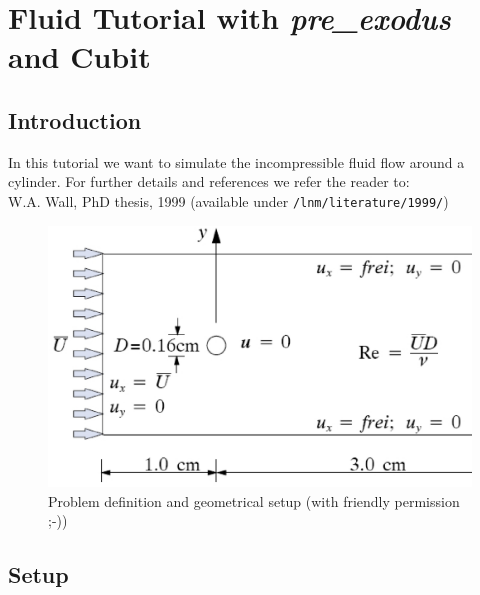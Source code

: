 
\newcommand{\prexo}{\emph{pre\_exodus \,}}
\newcommand{\bc}{\emph{bc-file \,}}
\newcommand{\head}{\emph{header-file \,}}

\chapter{Fluid Tutorial with \prexo and Cubit}
\label{tut_fluid_preexo:chap}

\section{Introduction}
In this tutorial we want to simulate the incompressible fluid flow around a cylinder.
For further details and references we refer the reader to:\\
W.A. Wall, PhD thesis, 1999
(available under \texttt{/lnm/literature/1999/})
\begin{figure}[h]
\begin{center}
 \includegraphics[scale=0.35]{pics/tut_fluid_problem}
 \caption{Problem definition and geometrical setup (with friendly permission ;-))}
\label{fig:tut_fluid_preexo_setup}
\end{center}
\end{figure}

\section{\baci{} Setup}

